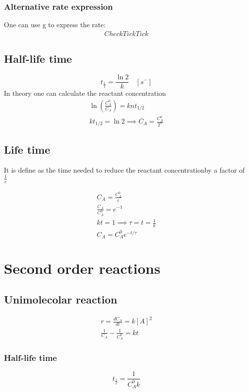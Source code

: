 \documentclass[../Master.tex]{subfiles}
\begin{document}
\begin{multicols*}{2}
				   \subsubsection{Alternative rate expression}
						    One can use g to express the rate:
						    \begin{gather*}
								     Check TickTick
						    \end{gather*}

		  \subsection{Half-life time}
				   \[
						    t_{\frac{1}{2}} = \frac{\ln2}{k} \quad [s^{-}]
				   \]
				   In theory one can calculate the reactant concentration
				   \begin{gather*}
						    \ln \left( \frac{C_{A}^0 }{C_{A} } \right) = knt_{1 / 2}\\
						    kt_{1 / 2} = \ln 2 \implies C_{A} = \frac{C_{A}^0 }{2^n}
				   \end{gather*}

		  \subsection{Life time}
				   It is define as the time needed to reduce the reactant concentrationby a factor
				   of \( \frac{1}{e} \)

				   \begin{gather*}
						    C_{A}= \frac{C_A^0}{e}\\
						    \frac{C_{A}}{C_{A}^0} = e^{-1}\\
						    kt = 1 \implies \tau = t = \frac{1}{k} \\
						    C_{A} = C_{A}^{0} e^{- t / \tau }
				   \end{gather*}

		 \section{Second order reactions}
		  \subsection{Unimolecolar reaction}
				   \begin{gather*}
						    r = \frac{dC_{A}}{dt} = k[A]^{2} \\
						    \frac{1}{C_{A} } - \frac{1}{C_{A} ^{0}} = kt
				   \end{gather*}
				   \subsubsection{Half-life time}
						    \[
								     t_{\frac{1}{2}} = \frac{1}{C_{A} ^{0}k}
						    \]


\end{multicols*}
\end{document}
